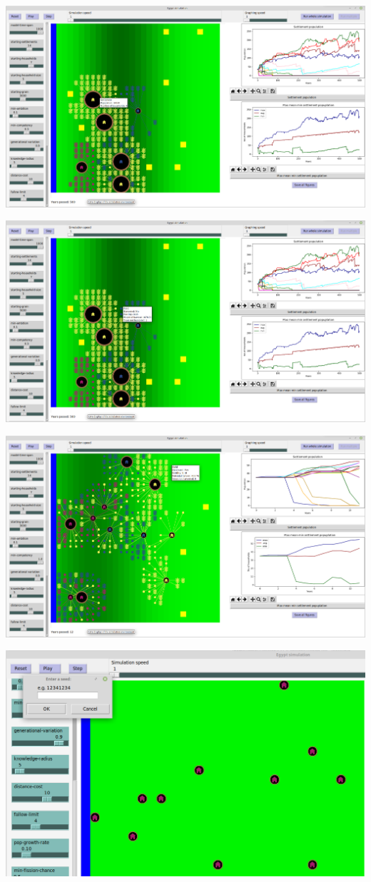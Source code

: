 \documentclass[12pt]{article}
\begin{document}
		\includegraphics[width=\linewidth]{RightClickOnSettlement}
		
		\includegraphics[width=\linewidth]{RightClickOnNotHarvestedField}
		
		\includegraphics[width=\linewidth]{RightClickOnHarvestedField}
		
		\includegraphics[width=\linewidth]{SeedEntry}
		
\end{document}
